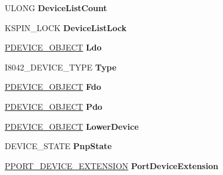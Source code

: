 \begin{DoxyCompactItemize}
U\+L\+O\+NG {\bfseries Device\+List\+Count}
\item 
\mbox{\label{struct___f_d_o___d_e_v_i_c_e___e_x_t_e_n_s_i_o_n_ae6f9d5c66e5acd11a46acc74658d27ee}} 
K\+S\+P\+I\+N\+\_\+\+L\+O\+CK {\bfseries Device\+List\+Lock}
\item 
\mbox{\label{struct___f_d_o___d_e_v_i_c_e___e_x_t_e_n_s_i_o_n_a6336d2366636b5e3abf09618a2daee2e}} 
\hyperlink{struct___d_e_v_i_c_e___o_b_j_e_c_t}{P\+D\+E\+V\+I\+C\+E\+\_\+\+O\+B\+J\+E\+CT} {\bfseries Ldo}
\item 
\mbox{\label{struct___f_d_o___d_e_v_i_c_e___e_x_t_e_n_s_i_o_n_a5a5d46f7fee592c0b5b524e5aaa09f81}} 
I8042\+\_\+\+D\+E\+V\+I\+C\+E\+\_\+\+T\+Y\+PE {\bfseries Type}
\item 
\mbox{\label{struct___f_d_o___d_e_v_i_c_e___e_x_t_e_n_s_i_o_n_a5dc965b71b5724ca50f2c32ffd36c8cb}} 
\hyperlink{struct___d_e_v_i_c_e___o_b_j_e_c_t}{P\+D\+E\+V\+I\+C\+E\+\_\+\+O\+B\+J\+E\+CT} {\bfseries Fdo}
\item 
\mbox{\label{struct___f_d_o___d_e_v_i_c_e___e_x_t_e_n_s_i_o_n_ad4d151bb1340ba667e906b2161cfdc26}} 
\hyperlink{struct___d_e_v_i_c_e___o_b_j_e_c_t}{P\+D\+E\+V\+I\+C\+E\+\_\+\+O\+B\+J\+E\+CT} {\bfseries Pdo}
\item 
\mbox{\label{struct___f_d_o___d_e_v_i_c_e___e_x_t_e_n_s_i_o_n_a25675103f00b5726ed8307cb8d754bc2}} 
\hyperlink{struct___d_e_v_i_c_e___o_b_j_e_c_t}{P\+D\+E\+V\+I\+C\+E\+\_\+\+O\+B\+J\+E\+CT} {\bfseries Lower\+Device}
\item 
\mbox{\label{struct___f_d_o___d_e_v_i_c_e___e_x_t_e_n_s_i_o_n_a7e1fe705db6845367304fc84c0c74817}} 
D\+E\+V\+I\+C\+E\+\_\+\+S\+T\+A\+TE {\bfseries Pnp\+State}
\item 
\mbox{\label{struct___f_d_o___d_e_v_i_c_e___e_x_t_e_n_s_i_o_n_af5926fc499ff54e3b3a49a5a5133b94a}} 
\hyperlink{struct___p_o_r_t___d_e_v_i_c_e___e_x_t_e_n_s_i_o_n}{P\+P\+O\+R\+T\+\_\+\+D\+E\+V\+I\+C\+E\+\_\+\+E\+X\+T\+E\+N\+S\+I\+ON} {\bfseries Port\+Device\+Extension}

\end{DoxyCompactItemize}
